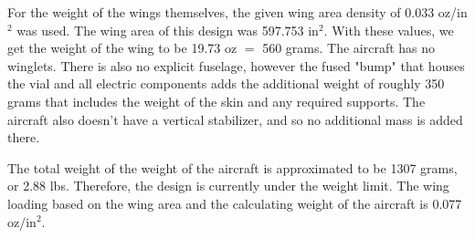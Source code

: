         For the weight of the wings themselves, the given wing area density of 0.033 oz/in$^2$ was used. The wing area of this design was 597.753 in$ ^2 $. With these values, we get the weight of the wing to be 19.73 oz $ = $ 560 grams.
        The aircraft has no winglets. There is also no explicit fuselage, however the fused "bump" that houses the vial and all electric components adds the additional weight of roughly 350 grams that includes the weight of the skin and any required supports. The aircraft also doesn't have a vertical stabilizer, and so no additional mass is added there.
        
        The total weight of the weight of the aircraft is approximated to be 1307 grams, or 2.88 lbs. Therefore, the design is currently under the weight limit. The wing loading based on the wing area and the calculating weight of the aircraft is 0.077 oz/in$^2$. 
        

